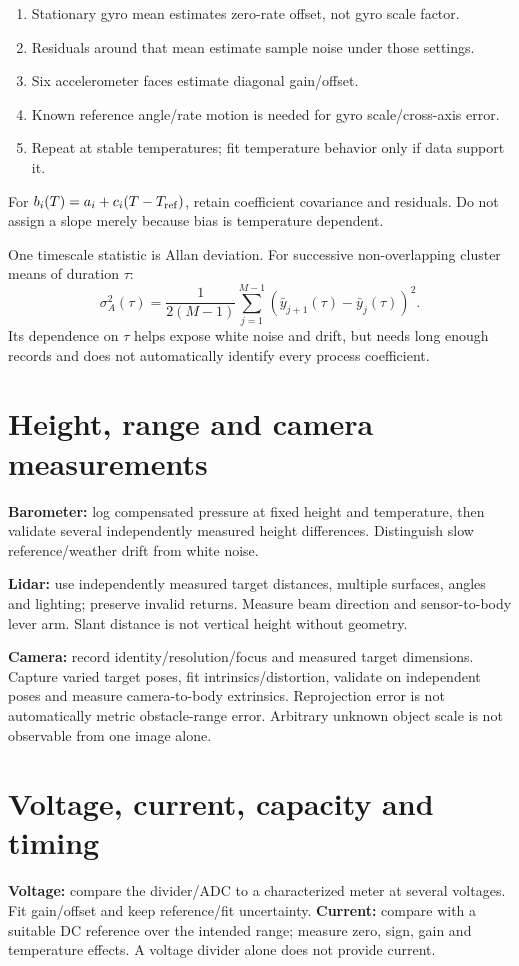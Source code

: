 \begin{enumerate}
\item Stationary gyro mean estimates zero-rate offset, not gyro scale factor.
\item Residuals around that mean estimate sample noise under those settings.
\item Six accelerometer faces estimate diagonal gain/offset.
\item Known reference angle/rate motion is needed for gyro scale/cross-axis error.
\item Repeat at stable temperatures; fit temperature behavior only if data support it.
\end{enumerate}
For $b_i(T)=a_i+c_i(T-T_{\rm ref})$, retain coefficient covariance and residuals.
Do not assign a slope merely because bias is temperature dependent.

One timescale statistic is Allan deviation. For successive non-overlapping
cluster means of duration $\tau$:
\begin{equation}
\sigma_A^2(\tau)=\frac1{2(M-1)}
\sum_{j=1}^{M-1}(\bar y_{j+1}(\tau)-\bar y_j(\tau))^2.
\end{equation}
Its dependence on $\tau$ helps expose white noise and drift, but needs long enough
records and does not automatically identify every process coefficient.

\section{Height, range and camera measurements}
\textbf{Barometer:} log compensated pressure at fixed height and temperature,
then validate several independently measured height differences. Distinguish
slow reference/weather drift from white noise.

\textbf{Lidar:} use independently measured target distances, multiple surfaces,
angles and lighting; preserve invalid returns. Measure beam direction and
sensor-to-body lever arm. Slant distance is not vertical height without geometry.

\textbf{Camera:} record identity/resolution/focus and measured target dimensions.
Capture varied target poses, fit intrinsics/distortion, validate on independent
poses and measure camera-to-body extrinsics. Reprojection error is not
automatically metric obstacle-range error. Arbitrary unknown object scale is not
observable from one image alone.

\section{Voltage, current, capacity and timing}
\textbf{Voltage:} compare the divider/ADC to a characterized meter at several
voltages. Fit gain/offset and keep reference/fit uncertainty.
\textbf{Current:} compare with a suitable DC reference over the intended range;
measure zero, sign, gain and temperature effects. A voltage divider alone does
not provide current.


